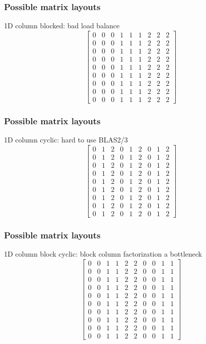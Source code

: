 \documentclass{beamer}
\begin{document}
\begin{frame}
  \frametitle{Possible matrix layouts}

  1D column blocked: bad load balance
  \[
  \begin{bmatrix}
    0 & 0 & 0 & 1 & 1 & 1 & 2 & 2 & 2 \\
    0 & 0 & 0 & 1 & 1 & 1 & 2 & 2 & 2 \\
    0 & 0 & 0 & 1 & 1 & 1 & 2 & 2 & 2 \\
    0 & 0 & 0 & 1 & 1 & 1 & 2 & 2 & 2 \\
    0 & 0 & 0 & 1 & 1 & 1 & 2 & 2 & 2 \\
    0 & 0 & 0 & 1 & 1 & 1 & 2 & 2 & 2 \\
    0 & 0 & 0 & 1 & 1 & 1 & 2 & 2 & 2 \\
    0 & 0 & 0 & 1 & 1 & 1 & 2 & 2 & 2 \\
    0 & 0 & 0 & 1 & 1 & 1 & 2 & 2 & 2 
  \end{bmatrix}
  \]
\end{frame}


\begin{frame}
  \frametitle{Possible matrix layouts}

  1D column cyclic: hard to use BLAS2/3
  \[
  \begin{bmatrix}
    0 & 1 & 2 & 0 & 1 & 2 & 0 & 1 & 2 \\
    0 & 1 & 2 & 0 & 1 & 2 & 0 & 1 & 2 \\
    0 & 1 & 2 & 0 & 1 & 2 & 0 & 1 & 2 \\
    0 & 1 & 2 & 0 & 1 & 2 & 0 & 1 & 2 \\
    0 & 1 & 2 & 0 & 1 & 2 & 0 & 1 & 2 \\
    0 & 1 & 2 & 0 & 1 & 2 & 0 & 1 & 2 \\
    0 & 1 & 2 & 0 & 1 & 2 & 0 & 1 & 2 \\
    0 & 1 & 2 & 0 & 1 & 2 & 0 & 1 & 2 \\
    0 & 1 & 2 & 0 & 1 & 2 & 0 & 1 & 2 
  \end{bmatrix}
  \]
\end{frame}


\begin{frame}
  \frametitle{Possible matrix layouts}

  1D column block cyclic: block column factorization a bottleneck
  \[
  \begin{bmatrix}
    0 & 0 & 1 & 1 & 2 & 2 & 0 & 0 & 1 & 1 \\
    0 & 0 & 1 & 1 & 2 & 2 & 0 & 0 & 1 & 1 \\
    0 & 0 & 1 & 1 & 2 & 2 & 0 & 0 & 1 & 1 \\
    0 & 0 & 1 & 1 & 2 & 2 & 0 & 0 & 1 & 1 \\
    0 & 0 & 1 & 1 & 2 & 2 & 0 & 0 & 1 & 1 \\
    0 & 0 & 1 & 1 & 2 & 2 & 0 & 0 & 1 & 1 \\
    0 & 0 & 1 & 1 & 2 & 2 & 0 & 0 & 1 & 1 \\
    0 & 0 & 1 & 1 & 2 & 2 & 0 & 0 & 1 & 1 \\
    0 & 0 & 1 & 1 & 2 & 2 & 0 & 0 & 1 & 1 \\
    0 & 0 & 1 & 1 & 2 & 2 & 0 & 0 & 1 & 1
  \end{bmatrix}
  \]
\end{frame}
\end{document}
